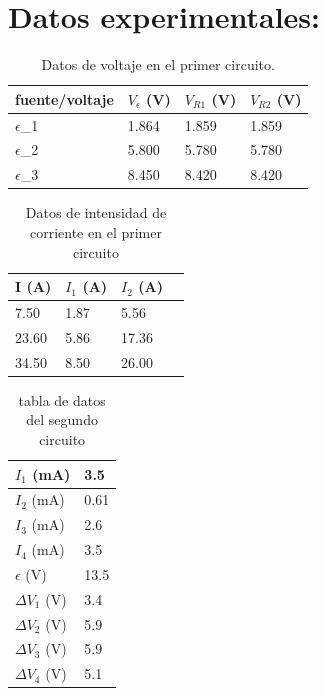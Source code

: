 \documentclass[twocolumn]{article}
\begin{document}
\section{Datos experimentales:} 

\begin{table}[H]
    \centering
    \begin{tabular}{|l|l|l|l|}
    \hline
    fuente/voltaje & $V_{\epsilon}$ (V) & $V_{R1}$ (V) & $V_{R2}$ (V) \\ \hline
    $\epsilon$_1 & 1.864 & 1.859 & 1.859 \\ \hline
    $\epsilon$_2 & 5.800 & 5.780 & 5.780 \\ \hline
    $\epsilon$_3 & 8.450 & 8.420 & 8.420 \\ \hline
    \end{tabular}
    \caption{Datos de voltaje en el primer circuito.}
\end{table}

\begin{table}[H]
    \centering
    \begin{tabular}{|l|l|l|l|}
    \hline
        I (A) & $I_{1}$ (A) & $I_{2}$ (A) \\ \hline
        7.50 & 1.87 & 5.56 \\ \hline
        23.60 & 5.86 & 17.36 \\ \hline
        34.50 & 8.50 & 26.00 \\ \hline
    \end{tabular}
    \caption{Datos de intensidad de corriente en el primer circuito}
\end{table}

\begin{table}[H]
    \centering
    \begin{tabular}{|l|l|}
    \hline
        $I_{1}$ (mA) & 3.5 \\ \hline
        $I_2$ (mA) & 0.61 \\ \hline
        $I_3$ (mA) & 2.6 \\ \hline
        $I_4$ (mA) & 3.5 \\ \hline
        $\epsilon$ (V) & 13.5 \\ \hline
        $\Delta$$V_1$ (V) & 3.4 \\ \hline
        $\Delta$$V_2$ (V) & 5.9 \\ \hline
        $\Delta$$V_3$ (V) & 5.9 \\ \hline
        $\Delta$$V_4$ (V) & 5.1 \\ \hline
    \end{tabular}
    \caption{tabla de datos del segundo circuito}
\end{table}
\end{document}
